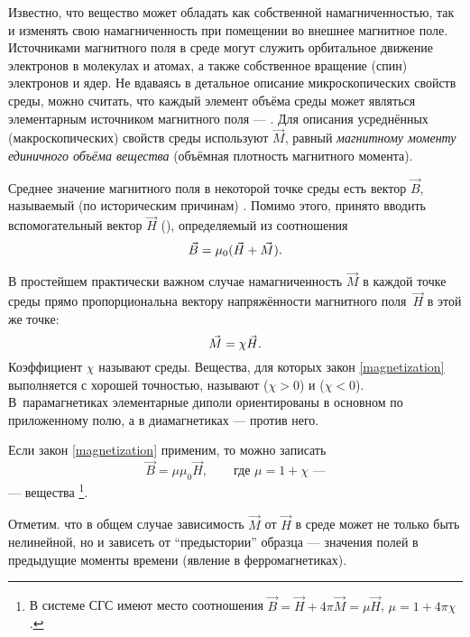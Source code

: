 Известно, что вещество может обладать как собственной намагниченностью, так
и изменять свою намагниченность при помещении во внешнее магнитное поле.
Источниками магнитного поля в среде могут служить орбитальное движение электронов
в молекулах и атомах, а также собственное вращение (спин) электронов и ядер.
Не вдаваясь в детальное описание микроскопических свойств среды, можно считать,
что каждый элемент объёма среды может являться элементарным источником
магнитного поля --- . Для описания усреднённых
(макроскопических) свойств среды используют
 $\vec{M}$, равный
\emph{магнитному моменту единичного объёма вещества} (объёмная плотность магнитного момента).

Среднее значение магнитного поля в некоторой точке среды есть вектор
$\vec{B}$, называемый (по историческим причинам) .
Помимо этого, принято вводить вспомогательный вектор $\vec{H}$
(), определяемый из соотношения
\begin{equation}
    \eqmark{fieldB}
    \vec{B} = \mu_0(\vec{H} + \vec{M}).
\end{equation}

В простейшем практически важном случае намагниченность $\vec{M}$ в каждой
точке среды прямо пропорциональна вектору напряжённости магнитного
поля~$\vec{H}$ в этой же точке:
\begin{equation}
    \eqmark{magnetization}
    \vec{M} = \chi\vec{H}.
\end{equation}
Коэффициент $\chi$ называют  среды.
Вещества, для которых закон \eqref{magnetization} выполняется
с хорошей точностью, называют  ($\chi > 0$) и
 ($\chi < 0$).
В~парамагнетиках элементарные диполи
ориентированы в основном по приложенному полю,
а в диамагнетиках --- против него.

Если закон \eqref{magnetization} применим,
то можно записать
\begin{equation}
    \vec{B} = \mu\mu_0 \vec{H},\qquad \text{где }\mu = 1 + \chi\text{~---}
\end{equation}
---  вещества%
\footnote{В системе СГС имеют место соотношения
    $\vec{B}=\vec{H}+4\pi\vec{M}=\mu\vec{H}$, $\mu = 1 + 4\pi \chi$.}.

Отметим. что в общем случае зависимость $\vec{M}$ от $\vec{H}$ в среде может
не только быть нелинейной, но и зависеть от ``предыстории'' образца ---
значения полей в предыдущие моменты времени
(явление  в ферромагнетиках).




